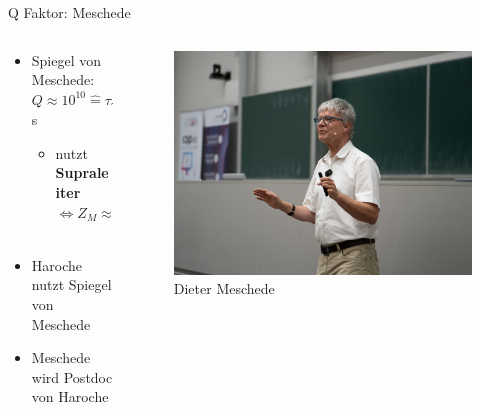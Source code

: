 \documentclass{beamer}
\begin{document}
\begin{frame}{Q Faktor: Meschede}
	\begin{columns}
		\begin{column}{0.5\textwidth}

			\begin{itemize}
				\item Spiegel von Meschede: $Q \approx 10^{10} \hat{=} \tau_{\gamma}\propto10^1$s
				      \begin{itemize}
					      \item nutzt \textbf{Supraleiter} $\Leftrightarrow Z_M \approx 0 \Leftrightarrow r\approx-1$\
				      \end{itemize}
				\item Haroche nutzt Spiegel von Meschede
				\item Meschede wird Postdoc von Haroche
			\end{itemize}
		\end{column}
		\begin{column}{0.5\textwidth}
			\begin{figure}
				\center\includegraphics[width=1\textwidth]{images/meschede.png}
				\caption{Dieter Meschede\cite{qute}}
			\end{figure}
		\end{column}
	\end{columns}
\end{frame}
\end{document}
